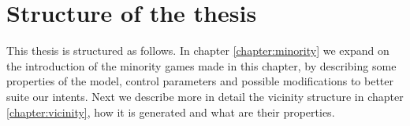 \section{Structure of the thesis}

This thesis is structured as follows.
In chapter \ref{chapter:minority} we expand on the introduction of the minority games made in this chapter, by describing some properties of the model, control parameters and possible modifications to better suite our intents. 
Next we describe more in detail the vicinity structure in chapter \ref{chapter:vicinity}, how it is generated and what are their properties.